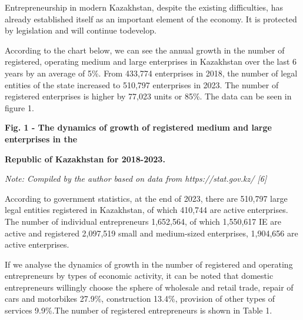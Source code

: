 \begin{multicols}{2}
Entrepreneurship in modern Kazakhstan, despite the existing
difficulties, has already established itself as an important element of
the economy. It is protected by legislation and will continue todevelop.

According to the chart below, we can see the annual growth in the number
of registered, operating medium and large enterprises in Kazakhstan over
the last 6 years by an average of 5\%. From 433,774 enterprises in 2018,
the number of legal entities of the state increased to 510,797
enterprises in 2023. The number of registered enterprises is higher by
77,023 units or 85\%. The data can be seen in figure 1.
\end{multicols}

{\bfseries Fig. 1 - The dynamics of growth of registered medium and large
enterprises in the}

{\bfseries Republic of Kazakhstan for 2018-2023.}

\emph{Note: Compiled by the author based on data from
https://stat.gov.kz/ {[}6{]}}

\begin{multicols}{2}
According to government statistics, at the end of 2023, there are
510,797 large legal entities registered in Kazakhstan, of which 410,744
are active enterprises. The number of individual entrepreneurs
1,652,564, of which 1,550,617 IE are active and registered 2,097,519
small and medium-sized enterprises, 1,904,656 are active enterprises.

If we analyse the dynamics of growth in the number of registered and
operating entrepreneurs by types of economic activity, it can be noted
that domestic entrepreneurs willingly choose the sphere of wholesale and
retail trade, repair of cars and motorbikes 27.9\%, construction 13.4\%,
provision of other types of services 9.9\%.The number of registered
entrepreneurs is shown in Table 1.
\end{multicols}


